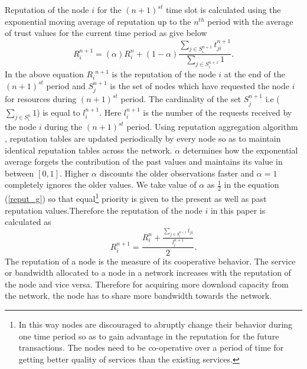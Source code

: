 \documentclass[journal]{IEEEtran}
\begin{document}
Reputation of the node $i$ for the $(n+1)^{st}$ time slot is calculated using the exponential moving average \cite{EMA} of reputation up to the $n^{th}$ period with the average of trust values for the current time period as give below
\begin{equation}
	\label{reput_g}
	R_i^{n+1}= (\alpha)R_i^n+(1-\alpha)\frac{\sum\limits_{j \in S_i^{n+1}}t_{ji}^{n+1}}{\sum\limits_{j \in S_i^{n+1}}1}.
\end{equation}
In the above equation ${R_i}^{n+1}$ is the reputation of the node $i$ at the end of the $(n+1)^{st}$ period and $S_{j}^{n+1}$ is the set of nodes which have requested the node $i$ for resources during $(n+1)^{st}$ period. The cardinality of the set $S_{j}^{n+1}$ i.e ($\sum\limits_{j \in S_i^n}1$) is equal to $l_i^{n+1}$. Here $l_i^{n+1}$ is the number of the requests received by the node $i$ during the $(n+1)^{st}$ period. Using reputation aggregation algorithm \cite{Gossip_Trust}\cite{DifferentialGossip},  reputation tables are updated periodically by every node so as to maintain identical reputation tables across the network. $\alpha$ determines how the exponential average forgets the contribution of the past values and maintains its value in between $[0,1]$. Higher $\alpha$ discounts the older observations faster and $\alpha=1$ completely ignores the  older values. We take value of $\alpha$ as $\frac{1}{2}$ in the equation (\ref{reput_g}) so that equal\footnote{In this way nodes are discouraged to abruptly change their behavior during one time period so as to gain advantage in the reputation for the future transactions. The nodes need to be co-operative over a period of time for getting better quality of services than the existing services.} priority is given to the present as well as past reputation values.Therefore the reputation of the node $i$ in this paper is calculated as
\begin{equation}
	\label{reput}
	R_i^{n+1}= \frac{R_i^n+\frac{\sum\limits_{j \in S_i^{n+1}}t_{ji}}{l_i^{n+1}}}{2}.
\end{equation}
The reputation of a node is the measure of its cooperative behavior. The service or bandwidth allocated to a node in a network increases with the reputation of the node and vice versa. Therefore for acquiring more download capacity from the network, the node has to share more bandwidth towards the network. 
\end{document}
